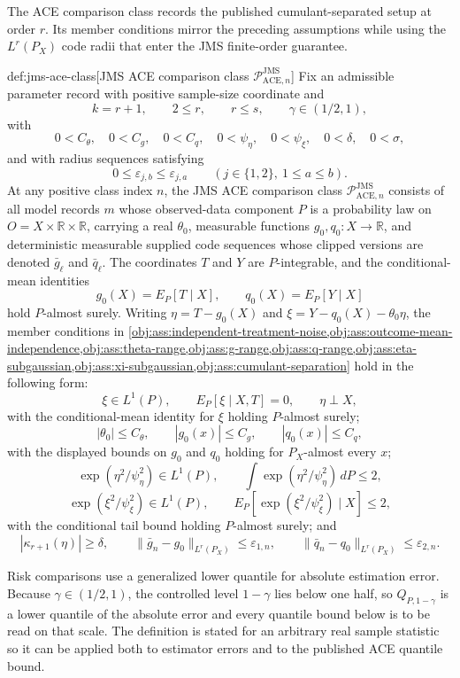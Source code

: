 The ACE comparison class records the published cumulant-separated setup at order \(r\). Its member conditions mirror the preceding assumptions while using the \(L^r(P_X)\) code radii that enter the JMS finite-order guarantee.

\begin{definitionv}{def:jms-ace-class}[JMS ACE comparison class \(\mathcal P_{\mathrm{ACE},n}^{\mathrm{JMS}}\)]
Fix an admissible parameter record with positive sample-size coordinate and
\[
k=r+1,\qquad 2\le r,\qquad r\le s,\qquad \gamma\in(1/2,1),
\]
with
\[
0<C_{\theta},\quad 0<C_g,\quad 0<C_q,\quad
0<\psi_{\eta},\quad 0<\psi_{\xi},\quad 0<\delta,
\quad 0<\sigma,
\]
and with radius sequences satisfying
\[
0\le \varepsilon_{j,b}\le \varepsilon_{j,a}
\qquad (j\in\{1,2\},\ 1\le a\le b).
\]
At any positive class index \(n\), the JMS ACE comparison class \(\mathcal P_{\mathrm{ACE},n}^{\mathrm{JMS}}\) consists of all model records \(m\) whose observed-data component \(P\) is a probability law on \(O=X\times\mathbb R\times\mathbb R\), carrying a real \(\theta_0\), measurable functions \(g_0,q_0:X\to\mathbb R\), and deterministic measurable supplied code sequences whose clipped versions are denoted \(\bar g_\ell\) and \(\bar q_\ell\). The coordinates \(T\) and \(Y\) are \(P\)-integrable, and the conditional-mean identities
\[
g_0(X)=E_P[T\mid X],\qquad q_0(X)=E_P[Y\mid X]
\]
hold \(P\)-almost surely. Writing \(\eta=T-g_0(X)\) and \(\xi=Y-q_0(X)-\theta_0\eta\), the member conditions in \cref{obj:ass:independent-treatment-noise,obj:ass:outcome-mean-independence,obj:ass:theta-range,obj:ass:g-range,obj:ass:q-range,obj:ass:eta-subgaussian,obj:ass:xi-subgaussian,obj:ass:cumulant-separation} hold in the following form:
\[
\xi\in L^1(P),\qquad E_P[\xi\mid X,T]=0,\qquad \eta\perp X,
\]
with the conditional-mean identity for \(\xi\) holding \(P\)-almost surely;
\[
|\theta_0|\le C_{\theta},\qquad |g_0(x)|\le C_g,
\qquad |q_0(x)|\le C_q,
\]
with the displayed bounds on \(g_0\) and \(q_0\) holding for \(P_X\)-almost every \(x\);
\[
\exp(\eta^2/\psi_{\eta}^2)\in L^1(P),\qquad
\int \exp(\eta^2/\psi_{\eta}^2)\,dP\le 2,
\]
\[
\exp(\xi^2/\psi_{\xi}^2)\in L^1(P),\qquad
E_P[\exp(\xi^2/\psi_{\xi}^2)\mid X]\le 2,
\]
with the conditional tail bound holding \(P\)-almost surely; and
\[
|\kappa_{r+1}(\eta)|\ge\delta,\qquad
\|\bar g_n-g_0\|_{L^r(P_X)}\le\varepsilon_{1,n},\qquad
\|\bar q_n-q_0\|_{L^r(P_X)}\le\varepsilon_{2,n}.
\]
\end{definitionv}

Risk comparisons use a generalized lower quantile for absolute estimation error. Because \(\gamma\in(1/2,1)\), the controlled level \(1-\gamma\) lies below one half, so \(Q_{P,1-\gamma}\) is a lower quantile of the absolute error and every quantile bound below is to be read on that scale. The definition is stated for an arbitrary real sample statistic so it can be applied both to estimator errors and to the published ACE quantile bound.

